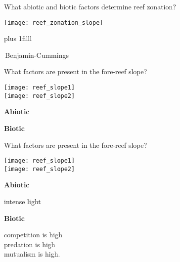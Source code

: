 \documentclass[t,handout]{beamer}  %
\begin{document}

\begin{frame}[t]{What abiotic and biotic factors determine reef zonation?}

\texttt{[image: reef\_zonation\_slope]}

\vskip0pt plus 1filll

\tiny\textcopyright\,Benjamin-Cummings
\end{frame}

\begin{frame}[t]{What factors are present in the fore-reef slope?}

\begin{multicols}{2}
	\begin{center}
	
	\texttt{[image: reef\_slope1]}\\[1ex]
	
	\texttt{[image: reef\_slope2]}
	\end{center}
\columnbreak

	\hangpara\textbf{Abiotic}
	
	\vspace*{4\baselineskip}
	
	\hangpara\textbf{Biotic}
	
	
\end{multicols}
\end{frame}

\begin{frame}[t]{What factors are present in the fore-reef slope?}

\begin{multicols}{2}
	\begin{center}
	
	\texttt{[image: reef\_slope1]}\\[1ex]
	
	\texttt{[image: reef\_slope2]}
	\end{center}
\columnbreak

	\hangpara\textbf{Abiotic}
	
	\hangpara intense light\pause 

	\hangpara\textbf{Biotic}
	
	\hangpara competition is high\\\pause predation is high\\\pause mutualism is high.

	
\end{multicols}
\end{frame}
\end{document}
